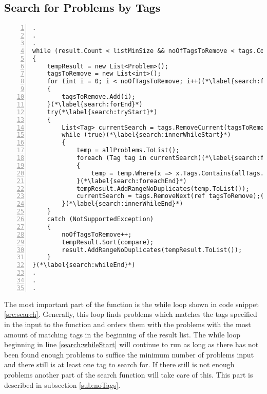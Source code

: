 \subsection{Search for Problems by Tags}
\label{sub:searchTags}
\begin{lstlisting}[style=sourceCode, caption=\myCaption{The while loop which finds and sorts problems matching the input tags}, label=src:search, numbers=left, numberstyle=\footnotesize]
.
.
.
while (result.Count < listMinSize && noOfTagsToRemove < tags.Count)(*\label{search:whileStart}*)
{
	tempResult = new List<Problem>();
	tagsToRemove = new List<int>();
	for (int i = 0; i < noOfTagsToRemove; i++)(*\label{search:forStart}*)
	{
		tagsToRemove.Add(i);
	}(*\label{search:forEnd}*)
	try(*\label{search:tryStart}*)
	{
		List<Tag> currentSearch = tags.RemoveCurrent(tagsToRemove);
		while (true)(*\label{search:innerWhileStart}*)
		{
			temp = allProblems.ToList();
			foreach (Tag tag in currentSearch)(*\label{search:foreachStart}*)
			{
				temp = temp.Where(x => x.Tags.Contains(allTags.FirstOrDefault(y => y.Id == tag.Id))).ToList();
			}(*\label{search:foreachEnd}*)
			tempResult.AddRangeNoDuplicates(temp.ToList());
			currentSearch = tags.RemoveNext(ref tagsToRemove);(*\label{search:removeNext}*)
		}(*\label{search:innerWhileEnd}*)
	}
	catch (NotSupportedException)
	{
		noOfTagsToRemove++;
		tempResult.Sort(compare);
		result.AddRangeNoDuplicates(tempResult.ToList());
	}
}(*\label{search:whileEnd}*)
.
.
.
\end{lstlisting}

The most important part of the  function is the while loop shown in code snippet \ref{src:search}.
Generally, this loop finds problems which matches the tags specified in the input to the function and orders them with the problems with the most amount of matching tags in the beginning of the result list.
The while loop beginning in line \ref{search:whileStart} will continue to run as long as there has not been found enough problems to suffice the minimum number of problems input and there still is at least one tag to search for.
If there still is not enough problems another part of the search function will take care of this.
This part is described in subsection \ref{sub:noTags}.

